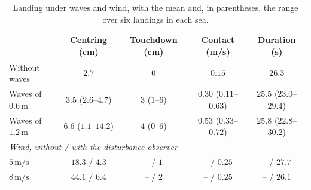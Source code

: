 \begin{table}[htbp]
    \centering
    \caption{Landing under waves and wind, with the mean and, in parentheses, the range over six landings in each sea.}
    \label{tab:res_landing}
    \begin{tabular}{lcccc}
        \toprule
         & \textbf{Centring} (cm) & \textbf{Touchdown} (cm) & \textbf{Contact} (m/s) & \textbf{Duration} (s) \\
        \midrule
        Without waves & $2.7$ & $0$ & $0.15$ & $26.3$ \\
        Waves of $0.6\,\text{m}$ & $3.5$ {\footnotesize ($2.6$--$4.7$)} & $3$ {\footnotesize ($1$--$6$)} & $0.30$ {\footnotesize ($0.11$--$0.63$)} & $25.5$ {\footnotesize ($23.0$--$29.4$)} \\
        Waves of $1.2\,\text{m}$ & $6.6$ {\footnotesize ($1.1$--$14.2$)} & $4$ {\footnotesize ($0$--$6$)} & $0.53$ {\footnotesize ($0.33$--$0.72$)} & $25.8$ {\footnotesize ($22.8$--$30.2$)} \\
        \midrule
        \multicolumn{5}{l}{\textit{Wind, without / with the disturbance observer}} \\
        $5\,\text{m/s}$  & $18.3$ / $4.3$  & -- / $1$ & -- / $0.25$ & -- / $27.7$ \\
        $8\,\text{m/s}$  & $44.1$ / $6.4$  & -- / $2$ & -- / $0.25$ & -- / $26.1$ \\
        \bottomrule
    \end{tabular}
\end{table}
